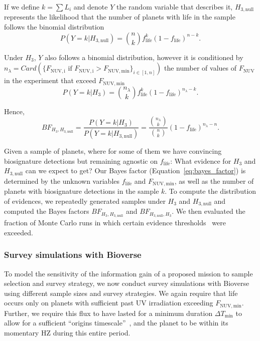 \documentclass[modern,linenumbers]{aastex631}
\begin{document}
If we define $k=\sum L_i$ and denote $Y$ the random variable that describes it, $H_\mathrm{3, null}$ represents the likelihood that the number of planets with life in the sample follows the binomial distribution
\begin{equation}
P(Y=k|H_\mathrm{3, null}) = \binom{n}{k}f_\mathrm{life}^k(1-f_\mathrm{life})^{n-k}.
\end{equation}

Under $H_3$, $Y$ also follows a binomial distribution, however it is conditioned by $n_{\lambda}=Card(\{F_\mathrm{NUV, i} \text{ if } F_\mathrm{NUV, i}>F_\mathrm{NUV, min}\}_{i \in [1,n]})$ the number of values of $F_\mathrm{NUV}$ in the experiment that exceed $F_\mathrm{NUV, min}$
\begin{equation}
P(Y=k|H_3) = \binom{n_{\lambda}}{k}f_\mathrm{life}^k(1-f_\mathrm{life})^{n_{\lambda}-k}.
\end{equation}

Hence,
\begin{equation}\label{eq:bayes_factor}
BF_{H_3,H_\mathrm{3, null}} = \frac{P(Y=k|H_3)}{P(Y=k|H_\mathrm{3, null})} = \frac{\binom{n_\lambda}{k}}{\binom{n}{k}}(1-f_\mathrm{life})^{n_{\lambda}-n}.
\end{equation}


Given a sample of planets, where for some of them we have convincing biosignature detections but remaining agnostic on $f_\mathrm{life}$: What evidence for $H_\mathrm{3}$ and $H_\mathrm{3, null}$ can we expect to get?
Our Bayes factor (Equation~\ref{eq:bayes_factor}) is determined by the unknown variables $f_\mathrm{life}$ and $F_\mathrm{NUV, min}$, as well as the number of planets with biosignature detections in the sample $k$.
To compute the distribution of evidences, we repeatedly generated samples under $H_\mathrm{3}$ and $H_\mathrm{3, null}$ and computed the Bayes factors $BF_{H_3,H_\mathrm{3, null}}$ and $BF_{H_\mathrm{3, null}, H_3}$.
We then evaluated the fraction of Monte Carlo runs in which certain evidence thresholds~\citep{Jeffreys1939} were exceeded.







\subsubsection{Survey simulations with Bioverse}
To model the sensitivity of the information gain of a proposed mission to sample selection and survey strategy, we now conduct survey simulations with Bioverse using different sample sizes and survey strategies.
We again require that life occurs only on planets with sufficient past UV irradiation exceeding $F_\mathrm{NUV, min}$.
Further, we require this flux to have lasted for a minimum duration $\Delta T_\mathrm{min}$ to allow for a sufficient ``origins timescale''~\citep{Rimmer2023}, and the planet to be within its momentary \gls{HZ} during this entire period.
\end{document}
